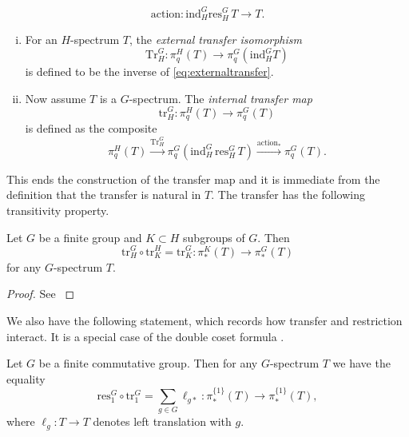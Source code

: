 \[
\mathrm{action}:\mathrm{ind}^G_H \mathrm{res}^G_H\,  T\to T.
\]
\begin{mydef}
\begin{enumerate}[(i)]
\item For an $H$-spectrum $T$, the \textit{external transfer isomorphism} 
\[
\mathrm{Tr}^G_H: \pi_q^H(T)\to \pi_q^G(\mathrm{ind}^G_H T)
\]
is defined to be the inverse of \eqref{eq:externaltransfer}.
\item Now assume $T$ is a $G$-spectrum. 
The \textit{internal transfer map}
\[
\mathrm{tr}^G_H: \pi_q^H(T)\to \pi_q^G( T)
\]
is defined as the composite
\[
 \pi_q^H(T)\xrightarrow{\mathrm{Tr}^G_H} \pi_q^G(\mathrm{ind}^G_H\,\mathrm{res}^G_H\, T)
 \xrightarrow{\mathrm{action}_\ast} \pi_q^G(T).
\]
\end{enumerate}
\end{mydef}
This ends the construction of the transfer map and it is immediate from the
definition that the transfer is natural in $T$. The transfer has the following transitivity
property.
\begin{prop}\label{prop:transfertransitivity}
Let $G$ be a finite group and $K\subset H$ subgroups of $G$.
Then 
\[
\mathrm{tr}^G_H\circ \mathrm{tr}^H_K = \mathrm{tr}^G_K:
\pi_\ast^K(T)\to \pi_\ast^G(T)
\]
for any $G$-spectrum $T$.
\end{prop}
\begin{proof}
See \cite[Proposition~4.16, \pno~31]{schwedeequivariant}
\end{proof}

We also have the following statement, which records how transfer and restriction
interact. It is a special case of the double coset formula \cite[Proposition~4.20, \pno~35]{schwedeequivariant}.
\begin{prop}\label{prop:doublecoset}
Let $G$ be a finite commutative group. Then for any $G$-spectrum $T$ we have the equality
\[
\mathrm{res}^G_1\circ \mathrm{tr}^G_1 = \sum_{g\in G} \ell_{g\ast}:
\pi_\ast^{\{1\}}(T)\to \pi_\ast^{\{1\}}(T),
\]
where $\ell_g:T\to T$ denotes left translation with $g$.
\end{prop}


